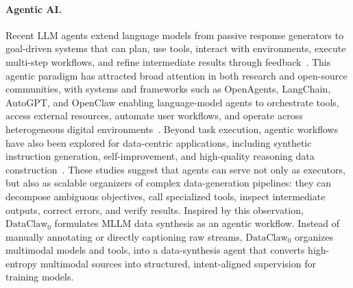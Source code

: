 \paragraph{Agentic AI.}
Recent LLM agents extend language models from passive response generators to goal-driven systems that can plan, use tools, interact with environments, execute multi-step workflows, and refine intermediate results through feedback~\cite{yao2022react,schick2023toolformer,shen2023hugginggpt,yao2023tree,shinn2023reflexion,wang2023voyager}. This agentic paradigm has attracted broad attention in both research and open-source communities, with systems and frameworks such as OpenAgents, LangChain, AutoGPT, and OpenClaw enabling language-model agents to orchestrate tools, access external resources, automate user workflows, and operate across heterogeneous digital environments~\cite{xie2023openagents,langchain2023,autogpt2023,openclaw2025}. Beyond task execution, agentic workflows have also been explored for data-centric applications, including synthetic instruction generation, self-improvement, and high-quality reasoning data construction~\cite{selfinstruct,wizardlm,orca,chen2024agentinstruct}. These studies suggest that agents can serve not only as executors, but also as scalable organizers of complex data-generation pipelines: they can decompose ambiguous objectives, call specialized tools, inspect intermediate outputs, correct errors, and verify results. Inspired by this observation, $\text{DataClaw}_0$ formulates MLLM data synthesis as an agentic workflow. Instead of manually annotating or directly captioning raw streams, $\text{DataClaw}_0$ organizes multimodal models and tools, into a data-synthesis agent that converts high-entropy multimodal sources into structured, intent-aligned supervision for training models.
